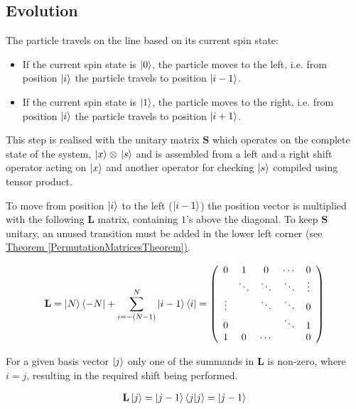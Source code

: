 \subsection{Evolution}

The particle travels on the line based on its current spin state:
\begin{itemize}
\item If the current spin state is $\ket{0}$, the particle moves to the left, i.e. from position $\ket{i}$ the particle travels to position $\ket{i-1}$.
\item If the current spin state is $\ket{1}$, the particle moves to the right, i.e. from position $\ket{i}$ the particle travels to position $\ket{i+1}$.
\end{itemize}

This step is realised with the unitary matrix $\mathbf{S}$ which operates on the complete state of the system, $\ket{x}\otimes{}\ket{s}$ and is assembled from a left and a right shift operator acting on $\ket{x}$ and another operator for checking $\ket{s}$ compiled using tensor product.

\begin{definition}

To move from position $\ket{i}$ to the left ($\ket{i-1}$) the position vector is multiplied with the following $\mathbf{L}$ matrix, containing $1$'s above the diagonal. To keep $\mathbf{S}$ unitary, an unused transition must be added in the lower left corner (see \hyperref[PermutationMatricesTheorem]{Theorem \ref{PermutationMatricesTheorem})}.

\begin{align}
\label{LeftShift}
\mathbf{L} = \ket{N}\bra{-N} + \sum\limits_{i=-(N-1)}^{N} \ket{i-1}\bra{i} =
\left(
    \begin{array}{ccccc}
        0      & 1      & 0      & \cdots & 0      \\
               & \ddots & \ddots & \ddots & \vdots \\
        \vdots &        & \ddots & \ddots & 0      \\
        0      &        &        & \ddots & 1      \\
        1      & 0      & \cdots &        & 0
      \end{array}
\right)
\end{align}

For a given basis vector $\ket{j}$ only one of the summands in $\mathbf{L}$ is non-zero, where $i=j$, resulting in the required shift being performed.

\begin{align*}
\mathbf{L}\ket{j} = \ket{j-1}\bra{j}\ket{j} = \ket{j-1}
\end{align*}

\end{definition}

